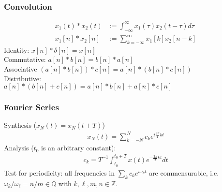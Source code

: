 \documentclass[6pt,landscape,a4paper]{article}
\begin{document}
\begin{multicols*}{5}
\subsubsection*{Convolution}
\vspace{-0.8em}
\begin{align*}
x_1(t)*x_2(t) &:= \textstyle\int_{-\infty}^{\infty} x_1(\tau) x_2(t-\tau)d\tau \\
x_1[n]*x_2[n] &:= \textstyle\sum_{k=-\infty}^{\infty} x_1[k] x_2[n-k]
\end{align*}
Identity: $x[n]*\delta[n]=x[n]$\\
Commutative: $a[n] * b[n] = b[n] * a[n]$\\
Associative  $(a[n]*b[n]) * c[n] = a[n] * ( b[n] * c[n])$ \\
Distributive: \\
$a[n]*(b[n]+c[n]) = a[n]*b[n] + a[n]*c[n]$   

\subsubsection*{Fourier Series}
Synthesis ($x_N(t) = x_N(t+T)$)
\begin{align*}
x_N(t) = \textstyle\sum_{k=-N}^{N} c_k e^{i \frac{2\pi}{T}kt}
\end{align*}
Analysis ($t_0$ is an arbitrary constant):
\begin{align*}
c_k = T^{-1}\textstyle\int_{t_0}^{t_0+T} x(t)e^{-\frac{2\pi}{T}kt}dt
\end{align*}
Test for periodicity: all frequencies in $\textstyle\sum_k c_k e^{i\omega_k t}$ are commensurable, i.e. $\omega_k / \omega_{\ell} = n/m \in \mathbb{Q}$ with $k,\ell,m,n \in \mathbb{Z}$.

\end{multicols*}
\end{document}
